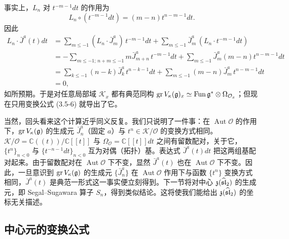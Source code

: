 
事实上，$L_n$ 对 $t^{-m-1}dt$ 的作用为
\[
    L_n\circ(t^{-m-1}dt)=(m-n)t^{n-m-1}dt .
\]
因此
\begin{align*}
    L_n\cdot\bar J^a(t)dt
    &=\sum_{m\le-1}(L_n\cdot\bar J^a_m)\,t^{-m-1}dt
      +\sum_{m\le-1}\bar J^a_m\,(L_n\cdot t^{-m-1}dt)\\
    &=-\sum_{m\le-1;\,n+m\le-1}m\bar J^a_{m+n}\,t^{-m-1}dt
      +\sum_{m\le-1}\bar J^a_m(m-n)t^{n-m-1}dt\\
    &=\sum_{k\le-1}(n-k)\bar J^a_k\,t^{n-k-1}dt
      +\sum_{m\le-1}(m-n)\bar J^a_m\,t^{n-m-1}dt\\
    &=0,
\end{align*}
如所预期。于是对任意局部域 $\mathcal{K}_x$ 都有典范同构 $\operatorname{gr}V_\kappa(\mathfrak{g})_x\simeq\operatorname{Fun}\mathfrak{g}^*\otimes\Omega_{\mathcal{O}_x}$；但现在只用变换公式 (3.5-6) 就导出了它。

当然，回头看来这个计算近乎同义反复。我们只说明了一件事：在 $\operatorname{Aut}\mathcal{O}$ 的作用下，$\operatorname{gr}V_\kappa(\mathfrak{g})$ 的生成元 $\bar J^a_n$（固定 $a$）与 $t^n\in\mathcal{K}/\mathcal{O}$ 的变换方式相同。$\mathcal{K}/\mathcal{O}=\mathbb{C}((t))/\mathbb{C}[[t]]$ 与 $\Omega_{\mathcal{O}}=\mathbb{C}[[t]]dt$ 之间有留数配对，关于它，$\{t^n\}_{n<0}$ 与 $\{t^{-n-1}dt\}_{n<0}$ 互为对偶（拓扑）基。表达式 $\bar J^a(t)dt$ 把这两组基配对起来。由于留数配对在 $\operatorname{Aut}\mathcal{O}$ 下不变，显然 $\bar J^a(t)$ 也在 $\operatorname{Aut}\mathcal{O}$ 下不变。因此，一旦意识到 $\operatorname{gr}V_\kappa(\mathfrak{g})$ 的生成元 $\{\bar J^a_n\}$ 在 $\operatorname{Aut}\mathcal{O}$ 作用下与函数 $\{t^n\}$ 变换方式相同，$\bar J^a(t)$ 是典范一形式这一事实便立刻得到。下一节将对中心 $\mathfrak{z}(\widehat{\mathfrak{sl}}_2)$ 的生成元，即 Segal–Sugawara 算子 $S_n$，得到类似结论。这将使我们能给出 $\mathfrak{z}(\widehat{\mathfrak{sl}}_2)$ 的坐标无关描述。


\subsection{中心元的变换公式}

